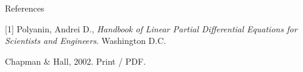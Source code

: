 \documentclass{article}
\begin{document}
\newpage

References


\vspace{4mm}


 [1] Polyanin, Andrei D., \textit{Handbook of Linear Partial Differential Equations for Scientists and Engineers}. Washington D.C.
 
 
 \vspace{2mm}
 
  \hspace{12mm}Chapman \(\&\) Hall, 2002. Print / PDF. 
\end{document}
